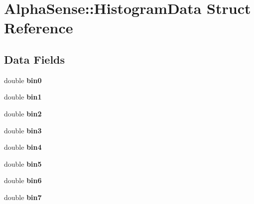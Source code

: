 \hypertarget{structAlphaSense_1_1HistogramData}{}\section{Alpha\+Sense\+:\+:Histogram\+Data Struct Reference}
\label{structAlphaSense_1_1HistogramData}
\subsection*{Data Fields}
\begin{DoxyCompactItemize}
\item 
\mbox{\label{structAlphaSense_1_1HistogramData_a63104f72f5bb25c39039730937eea7a1}} 
double {\bfseries bin0}
\item 
\mbox{\label{structAlphaSense_1_1HistogramData_ad267a631f774a1a4015975230cc60c38}} 
double {\bfseries bin1}
\item 
\mbox{\label{structAlphaSense_1_1HistogramData_aab565b8b4b062e3fbdd4f20163175f62}} 
double {\bfseries bin2}
\item 
\mbox{\label{structAlphaSense_1_1HistogramData_a7b6a77614d0bee02933bc1cff8fd954b}} 
double {\bfseries bin3}
\item 
\mbox{\label{structAlphaSense_1_1HistogramData_a714226c7a4c672cb813c17a37b56a1b8}} 
double {\bfseries bin4}
\item 
\mbox{\label{structAlphaSense_1_1HistogramData_a97b2b60f31631975208074c8f7def601}} 
double {\bfseries bin5}
\item 
\mbox{\label{structAlphaSense_1_1HistogramData_a514c258405abc3ff33a0a3e716831b4d}} 
double {\bfseries bin6}
\item 
\mbox{\label{structAlphaSense_1_1HistogramData_a286ce792b01a7e10e74acae1accc4aac}} 
double {\bfseries bin7}
\item 
\mbox{\label{structAlphaSense_1_1HistogramData_a0f08f4e0a858ac6171e95a3e59086d07}} 

\end{DoxyCompactItemize}
